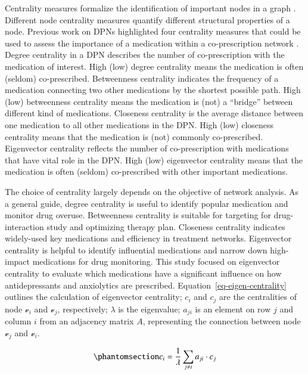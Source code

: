 \documentclass[
  authoryear,
  review]{elsarticle}
\begin{document}
Centrality measures formalize the identification of important nodes in a
graph \citep{estrada2012structure}. Different node centrality measures
quantify different structural properties of a node. Previous work on
DPNs highlighted four centrality measures that could be used to assess
the importance of a medication within a co-prescription network
\citep{Miglio2021}. Degree centrality in a DPN describes the number of
co-prescription with the medication of interest. High (low) degree
centrality means the medication is often (seldom) co-prescribed.
Betweenness centrality indicates the frequency of a medication
connecting two other medications by the shortest possible path. High
(low) betweenness centrality means the medication is (not) a ``bridge''
between different kind of medications. Closeness centrality is the
average distance between one medication to all other medications in the
DPN. High (low) closeness centrality means that the medication is (not)
commonly co-prescribed. Eigenvector centrality reflects the number of
co-prescription with medications that have vital role in the DPN. High
(low) eigenvector centrality means that the medication is often (seldom)
co-prescribed with other important medications.

The choice of centrality largely depends on the objective of network
analysis. As a general guide, degree centrality is useful to identify
popular medication and monitor drug overuse. Betweenness centrality is
suitable for targeting for drug-interaction study and optimizing therapy
plan. Closeness centrality indicates widely-used key medications and
efficiency in treatment networks. Eigenvector centrality is helpful to
identify influential medications and narrow down high-impact medications
for drug monitoring. This study focused on eigenvector centrality to
evaluate which medications have a significant influence on how
antidepressants and anxiolytics are prescribed.
Equation~\ref{eq-eigen-centrality} outlines the calculation of
eigenvector centrality; \(c_i\) and \(c_j\) are the centralities of node
\(\mathcal{v}_i\) and \(\mathcal{v}_j\), respectively; \(\lambda\) is
the eigenvalue; \(a_{ji}\) is an element on row \(j\) and column \(i\)
from an adjacency matrix \(A\), representing the connection between node
\(\mathcal{v}_j\) and \(\mathcal{v}_i\).

\begin{equation}\phantomsection\label{eq-eigen-centrality}{
\displaystyle c_i = \frac{1}{\lambda} \sum_{j \neq i} a_{ji} \cdot c_j
}\end{equation}
\end{document}
